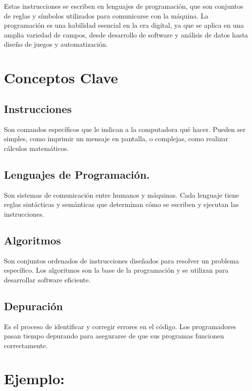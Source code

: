 \documentclass[
  a4paper,
  DIV=11,
  numbers=noendperiod,
  onepage,
  openany]{scrreprt}
\begin{document}
Estas instrucciones se escriben en lenguajes de programación, que son
conjuntos de reglas y símbolos utilizados para comunicarse con la
máquina. La programación es una habilidad esencial en la era digital, ya
que se aplica en una amplia variedad de campos, desde desarrollo de
software y análisis de datos hasta diseño de juegos y automatización.

\section{Conceptos Clave}\label{conceptos-clave}

\subsection{Instrucciones}\label{instrucciones}

Son comandos específicos que le indican a la computadora qué hacer.
Pueden ser simples, como imprimir un mensaje en pantalla, o complejas,
como realizar cálculos matemáticos.

\subsection{Lenguajes de
Programación.}\label{lenguajes-de-programaciuxf3n.}

Son sistemas de comunicación entre humanos y máquinas. Cada lenguaje
tiene reglas sintácticas y semánticas que determinan cómo se escriben y
ejecutan las instrucciones.

\subsection{Algoritmos}\label{algoritmos}

Son conjuntos ordenados de instrucciones diseñados para resolver un
problema específico. Los algoritmos son la base de la programación y se
utilizan para desarrollar software eficiente.

\subsection{Depuración}\label{depuraciuxf3n}

Es el proceso de identificar y corregir errores en el código. Los
programadores pasan tiempo depurando para asegurarse de que sus
programas funcionen correctamente.

\section{Ejemplo:}\label{ejemplo}
\end{document}
